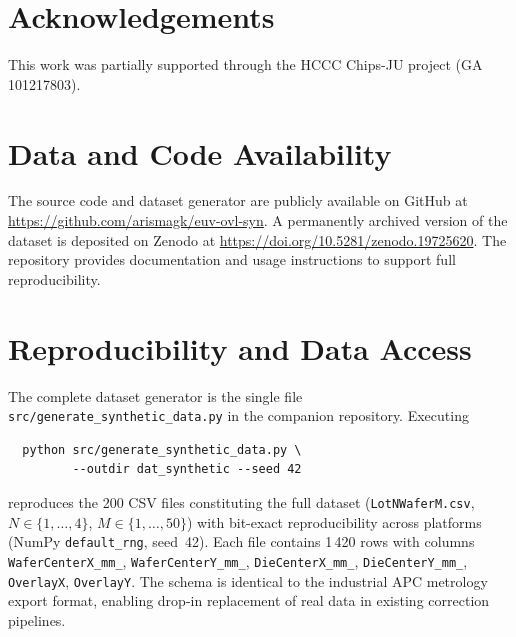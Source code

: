 \documentclass[10pt,conference]{IEEEtran}
\begin{document}
\section*{Acknowledgements}
This work was partially supported through the HCCC Chips-JU project
(GA 101217803).

\section*{Data and Code Availability}
The source code and dataset generator are publicly available on GitHub at
\url{https://github.com/arismagk/euv-ovl-syn}.
A permanently archived version of the dataset is deposited on Zenodo
\cite{magklaras2026zenodo} at \url{https://doi.org/10.5281/zenodo.19725620}.
The repository provides documentation and usage instructions to support
full reproducibility.

\appendix
\section{Reproducibility and Data Access}

The complete dataset generator is the single file
\texttt{src/generate\_synthetic\_data.py} in the companion repository.
Executing

\vspace{-2pt}
\begin{verbatim}
  python src/generate_synthetic_data.py \
         --outdir dat_synthetic --seed 42
\end{verbatim}

\vspace{-2pt}
\noindent reproduces the 200 CSV files constituting the full dataset
(\texttt{LotNWaferM.csv}, $N\in\{1,\ldots,4\}$, $M\in\{1,\ldots,50\}$) with
bit-exact reproducibility across platforms (NumPy \texttt{default\_rng},
seed~42).  Each file contains 1\,420 rows with columns
\texttt{WaferCenterX\_mm\_}, \texttt{WaferCenterY\_mm\_},
\texttt{DieCenterX\_mm\_}, \texttt{DieCenterY\_mm\_},
\texttt{OverlayX}, \texttt{OverlayY}.
The schema is identical to the industrial APC metrology export format,
enabling drop-in replacement of real data in existing correction pipelines.



\end{document}
